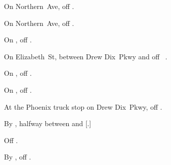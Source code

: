 
\begin{LocationList}

On Northern~Ave, off  .

On Northern~Ave, off  .

On , off  .

On Elizabeth~St, between Drew Dix~Pkwy and  off~ .

On , off  .

On , off  .

At the Phoenix truck stop on Drew Dix~Pkwy, off  .

By , halfway between  and [.]

Off  .

By , off  .

\end{LocationList}
